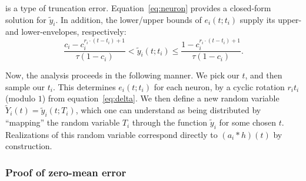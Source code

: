 is a type of truncation error.
Equation~\ref{eq:neuron} provides a closed-form solution for $\tilde{y}_i$.
In addition, the lower/upper bounds of $e_i(t; t_i)$ supply its upper- and lower-envelopes, respectively:
\begin{equation*}
\frac{c_i - c_i^{r_i \cdot (t - t_i) + 1}}{\tau(1 - c_i)} < \tilde{y}_i(t; t_i) \le \frac{1 - c_i^{r_i \cdot (t - t_i) + 1}}{\tau(1 - c_i)} \text{.}
\end{equation*}

Now, the analysis proceeds in the following manner.
We pick our $t$, and then sample our $t_i$.
This determines $e_i(t; t_i)$ for each neuron, by a cyclic rotation $r_i t_i$ (modulo $1$) from equation~\ref{eq:delta}.
We then define a new random variable $\tilde{Y}_i(t) = \tilde{y}_i(t; T_i)$, which one can understand as being distributed by ``mapping'' the random variable $T_i$ through the function $\tilde{y}_i$ for some chosen $t$.
Realizations of this random variable correspond directly to $\left(a_i \ast h \right)(t)$ by construction. 


\subsubsection{Proof of zero-mean error}

